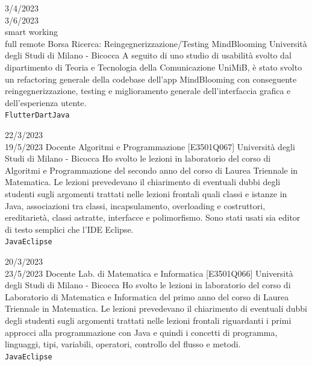 \documentclass[9pt]{developercv} %
\begin{document}
\begin{entrylist}

\entry
	{3/4/2023 \\ 3/6/2023 \\\footnotesize{smart working}\\\footnotesize{full remote}}
	{Borsa Ricerca: Reingegnerizzazione/Testing MindBlooming}
	{Università degli Studi di Milano - Bicocca}
	{A seguito di uno studio di usabilità svolto dal dipartimento di Teoria e Tecnologia della Comunicazione UniMiB, è stato svolto un refactoring generale della codebase dell’app MindBlooming con conseguente reingegnerizzazione, testing e miglioramento generale dell’interfaccia grafica e dell’esperienza utente.\\ \texttt{Flutter}\slashsep\texttt{Dart}\slashsep\texttt{Java}}

\entry
	{22/3/2023 \\ 19/5/2023}
	{Docente Algoritmi e Programmazione [E3501Q067]}
	{Università degli Studi di Milano - Bicocca}
	{Ho svolto le lezioni in laboratorio del corso di Algoritmi e Programmazione del secondo anno del corso di Laurea Triennale in Matematica. Le lezioni prevedevano il chiarimento di eventuali dubbi degli studenti sugli argomenti trattati nelle lezioni frontali quali classi e istanze in Java, associazioni tra classi, incapsulamento, overloading e costruttori, ereditarietà, classi astratte, interfacce e polimorfismo. Sono stati usati sia editor di testo semplici che l’IDE Eclipse.\\ \texttt{Java}\slashsep\texttt{Eclipse}}

\entry
	{20/3/2023 \\ 23/5/2023}
	{Docente Lab. di Matematica e Informatica [E3501Q066]}
	{Università degli Studi di Milano - Bicocca}
	{Ho svolto le lezioni in laboratorio del corso di Laboratorio di Matematica e Informatica del primo anno del corso di Laurea Triennale in Matematica. Le lezioni prevedevano il chiarimento di eventuali dubbi degli studenti sugli argomenti trattati nelle lezioni frontali riguardanti i primi approcci alla programmazione con Java e quindi i concetti di programma, linguaggi, tipi, variabili, operatori, controllo del flusso e metodi.\\ \texttt{Java}\slashsep\texttt{Eclipse}}
	

\end{entrylist}
\end{document}
